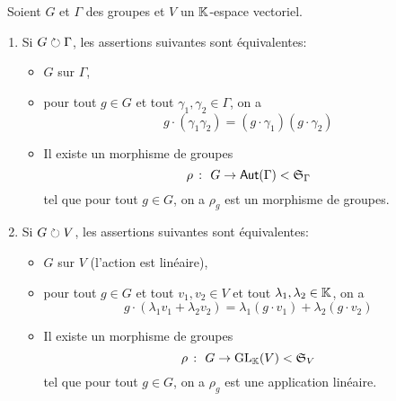 \begin{definition}\,
    Soient \(G\) et \(\Gamma\) des groupes et \(V\) un \(\mathbb{K}\)-espace vectoriel.
    \begin{enumerate}[label=(\roman*)]
        \item Si \(G\circlearrowright\Gamma\), les assertions suivantes sont équivalentes:
        \begin{itemize}
            \item \(G\)  sur \(\Gamma\),
            \item pour tout \(g\in G\) et tout \(\gamma_1,\gamma_2\in\Gamma\), on a
            \begin{equation*}
                g\cdot(\gamma_1\gamma_2) = (g\cdot\gamma_1)(g\cdot\gamma_2)
            \end{equation*}
            \item Il existe un morphisme de groupes
            \begin{equation*}
                \rho\ \colon\ G\to\operatorname{\mathsf{Aut}}(\Gamma) < {\mathfrak{S}}_\Gamma
            \end{equation*}
            tel que pour tout \(g\in G\), on a \(\rho_g\) est un morphisme de groupes.
        \end{itemize}
        
        \item Si \(G\circlearrowright V\), les assertions suivantes sont équivalentes:
        \begin{itemize}
            \item \(G\)  sur \(V\) (l'action est linéaire),
            \item pour tout \(g\in G\) et tout \(v_1,v_2\in V\) et tout \(\lambda_1,\lambda_2\in\mathbb{K}\), on a
            \begin{equation*}
                g\cdot(\lambda_1 v_1 + \lambda_2 v_2) = \lambda_1(g\cdot v_1) + \lambda_2(g\cdot v_2)
            \end{equation*}
            \item Il existe un morphisme de groupes
            \begin{equation*}
                \rho\ \colon\ G\to\text{GL}_{\mathbb{K}}(V) < {\mathfrak{S}}_V
            \end{equation*}
            tel que pour tout \(g\in G\), on a \(\rho_g\) est une application linéaire.
        \end{itemize}
    \end{enumerate}
\end{definition}

